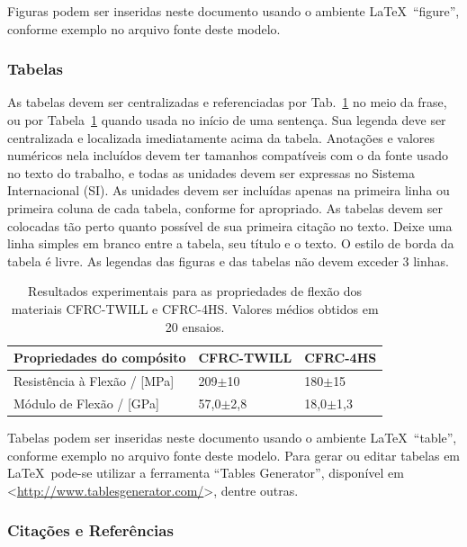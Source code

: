 \documentclass[%
  article,%
  10pt,%
  a4paper,%
  fleqn,%
  oneside,%
  sumario = tradicional,%
  chapter = TITLE,%
  section = TITLE,%
]{abntex2}
\begin{document}
Figuras podem ser inseridas neste documento usando o ambiente \LaTeX\ ``figure'', conforme exemplo no arquivo fonte deste modelo.

\subsubsection{Tabelas}\label{sssec:tabs}

As tabelas devem ser centralizadas e referenciadas por Tab.~\ref{tab:resexp} no meio da frase, ou por Tabela~\ref{tab:resexp} quando usada no início de uma sentença. Sua legenda deve ser centralizada e localizada imediatamente acima da tabela. Anotações e valores numéricos nela incluídos devem ter tamanhos compatíveis com o da fonte usado no texto do trabalho, e todas as unidades devem ser expressas no Sistema Internacional (SI). As unidades devem ser incluídas apenas na primeira linha ou primeira coluna de cada tabela, conforme for apropriado. As tabelas devem ser colocadas tão perto quanto possível de sua primeira citação no texto. Deixe uma linha simples em branco entre a tabela, seu título e o texto. O estilo de borda da tabela é livre. As legendas das figuras e das tabelas não devem exceder 3 linhas.

\begin{table}[!htb]
\centering
\caption{Resultados experimentais para as propriedades de flexão dos materiais CFRC-TWILL e CFRC-4HS. Valores médios obtidos em 20 ensaios.}
\label{tab:resexp}
\begin{tabular*}{\textwidth}{@{\extracolsep{\fill}}lll}
\hline
Propriedades do compósito    & CFRC-TWILL    & CFRC-4HS     \\ \hline
Resistência à Flexão / [MPa] & 209$\pm$10    & 180$\pm$15   \\
Módulo de Flexão / [GPa]     & 57,0$\pm$2,8  & 18,0$\pm$1,3 \\ \hline
\end{tabular*}
\end{table}

Tabelas podem ser inseridas neste documento usando o ambiente \LaTeX\ ``table'', conforme exemplo no arquivo fonte deste modelo. Para gerar ou editar tabelas em \LaTeX\ pode-se utilizar a ferramenta ``Tables Generator'', disponível em <\url{http://www.tablesgenerator.com/}>, dentre outras.

\subsubsection{Citações e Referências}\label{sssec:citref}
\end{document}
